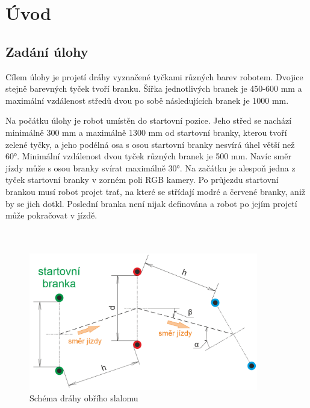 \documentclass{article}
\begin{document}



\newpage

\tableofcontents

\newpage

\section{Úvod}
\subsection{Zadání úlohy}

	Cílem úlohy  je projetí dráhy vyznačené tyčkami různých barev robotem. Dvojice stejně barevných tyček tvoří branku. Šířka jednotlivých branek je 450-600 mm a maximální vzdálenost středů dvou po sobě následujících branek je 1000 mm. 
	
	Na počátku úlohy je robot umístěn do startovní pozice. Jeho střed se nachází minimálně 300 mm a maximálně 1300 mm od startovní branky, kterou tvoří zelené tyčky, a jeho podélná osa s osou startovní branky nesvírá úhel větší než 60°. Minimální vzdálenost dvou tyček různých branek je 500 mm. Navíc směr jízdy může s osou branky svírat maximálně 30°. Na začátku je alespoň jedna z tyček startovní branky v zorném poli RGB kamery. Po průjezdu startovní brankou musí robot projet trať, na které se střídají modré a červené branky, aniž by se jich dotkl. Poslední branka není nijak definována a robot po jejím projetí může pokračovat v jízdě. 
	\\
	\\
	\\
	
	
\begin{figure}[h]
	\centering
	\includegraphics[width=10cm]{vykres_slalom_obri.png}
	\caption{Schéma dráhy obřího slalomu}
\end{figure}
\end{document}

